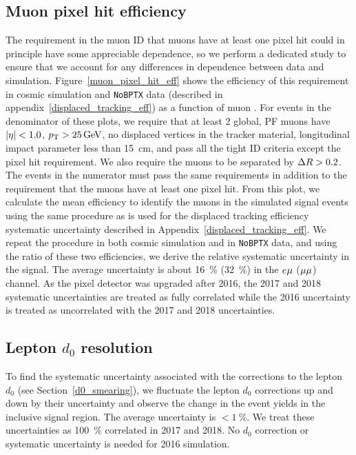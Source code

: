 \subsection{Muon pixel hit efficiency}
The requirement in the muon ID that muons have at least one pixel hit could in principle have some appreciable \ad dependence, so we perform a dedicated study to ensure that we account for any differences in \ad dependence between data and simulation. Figure~\ref{muon_pixel_hit_eff} shows the efficiency of this requirement in cosmic simulation and \texttt{NoBPTX} data (described in appendix~\ref{displaced_tracking_eff}) as a function of muon \ad. For events in the denominator of these plots, we require  that at least 2 global, PF muons have $\lvert \eta \rvert<1.0$, $\pt>\SI{25}{\GeV}$, no displaced vertices in the tracker material, longitudinal impact parameter less than \SI{15}{\cm}, and pass all the tight ID criteria except the pixel hit requirement. We also require the muons to be separated by $\Delta R>0.2$. The events in the numerator must pass the same requirements in addition to the requirement that the muons have at least one pixel hit. From this plot, we calculate the mean efficiency to identify the muons in the simulated signal events using the same procedure as is used for the displaced tracking efficiency systematic uncertainty described in Appendix~\ref{displaced_tracking_eff}. We repeat the procedure in both cosmic simulation and in \texttt{NoBPTX} data, and using the ratio of these two efficiencies, we derive the relative systematic uncertainty in the signal. The average uncertainty is about \SI{16}{\percent} (\SI{32}{\percent}) in the $e{\mu}$ (${\mu}{\mu}$) channel. As the pixel detector was upgraded after 2016, the 2017 and 2018 systematic uncertainties are treated as fully correlated while the 2016 uncertainty is treated as uncorrelated with the 2017 and 2018 uncertainties.



\subsection{Lepton $d_0$ resolution}
To find the systematic uncertainty associated with the corrections to the lepton $d_0$ (see Section~\ref{d0_smearing}), we fluctuate the lepton $d_0$ corrections up and down by their uncertainty and observe the change in the event yields in the inclusive signal region. The average uncertainty is $<\SI{1}{\percent}$. We treat these uncertainties as \SI{100}{\percent} correlated in 2017 and 2018. No $d_0$ correction or systematic uncertainty is needed for 2016 simulation.

\pagebreak